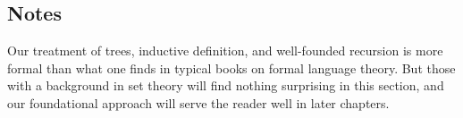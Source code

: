 \subsection{Notes}

Our treatment of trees, inductive definition, and well-founded
recursion is more formal than what one finds in typical books on
formal language theory.  But those with a background in set theory
will find nothing surprising in this section, and our foundational
approach will serve the reader well in later chapters.

